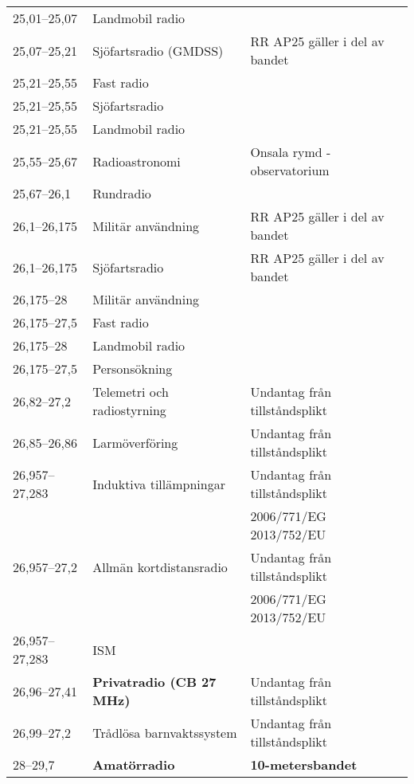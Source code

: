 \begin{landscape}
\begin{longtable}{lll}
25,01--25,07      & Landmobil radio                  &                                 \\
25,07--25,21      & Sjöfartsradio (GMDSS)            & RR AP25 gäller i del av bandet  \\
25,21--25,55      & Fast radio                       &                                 \\
25,21--25,55      & Sjöfartsradio                    &                                 \\
25,21--25,55      & Landmobil radio                  &                                 \\
25,55--25,67      & Radioastronomi                   & Onsala rymd - observatorium     \\
25,67--26,1       & Rundradio                        &                                 \\
26,1--26,175      & Militär användning               & RR AP25 gäller i del av bandet  \\
26,1--26,175      & Sjöfartsradio                    & RR AP25 gäller i del av bandet  \\
26,175--28        & Militär användning               &                                 \\
26,175--27,5      & Fast radio                       &                                 \\
26,175--28        & Landmobil radio                  &                                 \\
26,175--27,5      & Personsökning                    &                                 \\
26,82--27,2       & Telemetri och radiostyrning      & Undantag från tillståndsplikt   \\
26,85--26,86      & Larmöverföring                   & Undantag från tillståndsplikt   \\
26,957--27,283    & Induktiva tillämpningar          & Undantag från tillståndsplikt   \\
                  &                                  & 2006/771/EG 2013/752/EU         \\
26,957--27,2      & Allmän kortdistansradio          & Undantag från tillståndsplikt   \\
                  &                                  & 2006/771/EG 2013/752/EU         \\
26,957--27,283    & ISM                              &                                 \\
26,96--27,41      & \textbf{Privatradio (CB 27 MHz)} & Undantag från tillståndsplikt   \\
26,99--27,2       & Trådlösa barnvaktssystem         & Undantag från tillståndsplikt   \\
28--29,7          & \textbf{Amatörradio}             & \textbf{10-metersbandet}        \\
\end{longtable}
\end{landscape}
